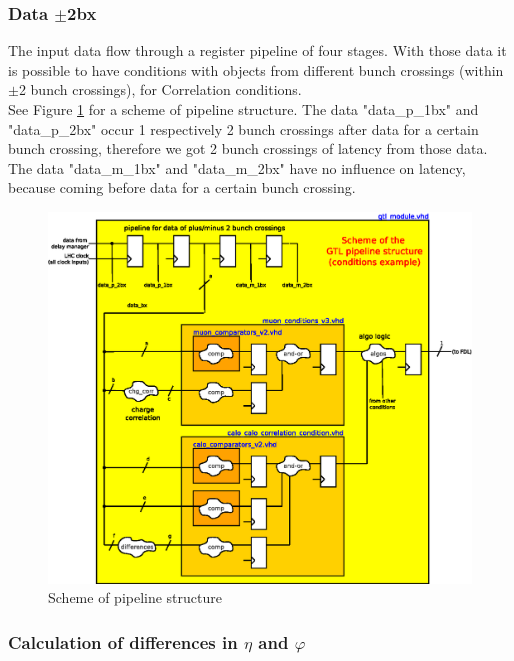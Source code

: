 \subsubsection{Data $\pm$2bx}
\label{sec:gtl:data_p_m_2bx}

The \ugtl input data flow through a register pipeline of four stages. With those data it is possible to have conditions with objects from
different bunch crossings (within $\pm$2 bunch crossings), \eg for Correlation conditions.\\
See Figure \ref{fig:gtl:gtl_pipeline} for a scheme of \ugtl pipeline structure. The data "data\_p\_1bx" and "data\_p\_2bx" occur 1 respectively 2 bunch crossings
after data for a certain bunch crossing, therefore we got 2 bunch crossings of latency from those data. The data "data\_m\_1bx" and "data\_m\_2bx" have no influence
on latency, because coming before data for a certain bunch crossing.

\begin{figure}[htb]
\centering
\includegraphics[width=15cm]{figures/gtl_pipeline}
\caption{Scheme of \ugtl pipeline structure} 
\label{fig:gtl:gtl_pipeline}
\end{figure}

\subsubsection{Calculation of differences in $\eta$ and $\varphi$}
\label{sec:gtl:calculation_differences}

